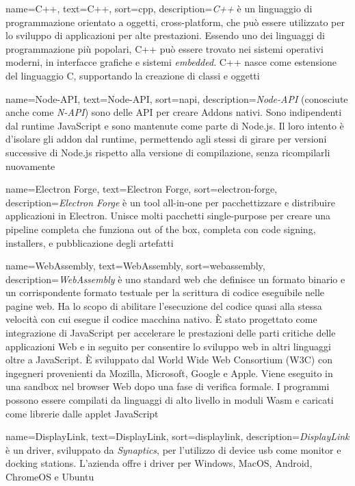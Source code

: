  {
    name=C++,
    text=C++,
    sort=cpp,
    description={\emph{C++} è un linguaggio di programmazione orientato a oggetti, cross-platform, che può essere utilizzato per lo sviluppo di applicazioni per alte prestazioni.
    Essendo uno dei linguaggi di programmazione più popolari, C++ può essere trovato nei sistemi operativi moderni, in interfacce grafiche e sistemi \emph{embedded}.
    C++ nasce come estensione del linguaggio C, supportando la creazione di classi e oggetti}
}

 {
    name=Node-API,
    text=Node-API,
    sort=napi,
    description={\emph{Node-API} (conosciute anche come \emph{N-API}) sono delle API per creare Addons nativi. Sono indipendenti dal runtime JavaScript e sono mantenute come parte di Node.js. Il loro intento è d'isolare gli addon dal runtime, permettendo agli stessi di girare per versioni successive di Node.js rispetto alla versione di compilazione, senza ricompilarli nuovamente}
}

 {
    name=Electron Forge,
    text=Electron Forge,
    sort=electron-forge,
    description={\emph{Electron Forge} è un tool all-in-one per pacchettizzare e distribuire applicazioni in Electron. Unisce molti pacchetti single-purpose per creare una pipeline completa che funziona out of the box, completa con code signing, installers, e pubblicazione degli artefatti}
}

 {
    name=WebAssembly,
    text=WebAssembly,
    sort=webassembly,
    description={\emph{WebAssembly} è uno standard web che definisce un formato binario e un corrispondente formato testuale per la scrittura di codice eseguibile nelle pagine web. Ha lo scopo di abilitare l'esecuzione del codice quasi alla stessa velocità con cui esegue il codice macchina nativo. È stato progettato come integrazione di JavaScript per accelerare le prestazioni delle parti critiche delle applicazioni Web e in seguito per consentire lo sviluppo web in altri linguaggi oltre a JavaScript. È sviluppato dal World Wide Web Consortium (W3C) con ingegneri provenienti da Mozilla, Microsoft, Google e Apple. Viene eseguito in una sandbox nel browser Web dopo una fase di verifica formale. I programmi possono essere compilati da linguaggi di alto livello in moduli Wasm e caricati come librerie dalle applet JavaScript}
}

 {
    name=DisplayLink,
    text=DisplayLink,
    sort=displaylink,
    description={\emph{DisplayLink} è un driver, sviluppato da \emph{Synaptics}, per l'utilizzo di device usb come monitor e docking stations. L'azienda offre i driver per Windows, MacOS, Android, ChromeOS e Ubuntu}
}

